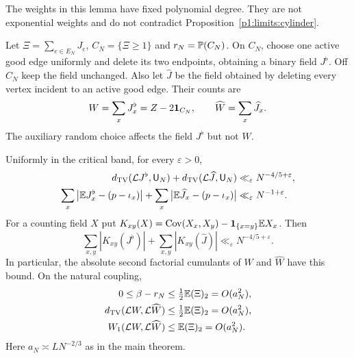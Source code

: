 The weights in this lemma have fixed polynomial degree.  They
are not exponential weights and do not contradict
Proposition~\ref{p1:limits:cylinder}.

Let $\Xi=\sum_{e\in E_N}J_e$, $C_N=\{\Xi\ge1\}$ and
$r_N=\P(C_N)$.  On $C_N$, choose one active good edge uniformly
and delete its two endpoints, obtaining a binary field $J^\flat$.
Off $C_N$ keep the field unchanged.  Also let $\widehat J$ be
the field obtained by deleting every vertex incident to an active
good edge.  Their counts are
\[
 W=\sum_xJ_x^\flat=Z-2\ind_{C_N},\qquad
 \widehat W=\sum_x\widehat J_x.
\]
The auxiliary random choice affects the field $J^\flat$ but
not $W$.

\begin{proposition}
\label{p1:limits:erasure}
Uniformly in the critical band, for every $\varepsilon>0$,
\begin{align}
 \TV(\Law J^\flat,\mathsf U_N)
       +\TV(\Law\widehat J,\mathsf U_N)
       &\ll_\varepsilon N^{-4/5+\varepsilon},
       \label{p1:limits:erasure-tv}\\
 \sum_x\big|\E J_x^\flat-(p-\iota_x)\big|
       +\sum_x\big|\E\widehat J_x-(p-\iota_x)\big|
       &\ll_\varepsilon N^{-1+\varepsilon}.
       \label{p1:limits:erasure-intensity}
\end{align}
For a counting field $X$ put
$K_{xy}(X)=\Cov(X_x,X_y)-\ind_{\{x=y\}}\E X_x$.
Then
\begin{equation}
 \sum_{x,y}|K_{xy}(J^\flat)|+
 \sum_{x,y}|K_{xy}(\widehat J)|
       \ll_\varepsilon N^{-4/5+\varepsilon}.
 \label{p1:limits:erasure-covariance}
\end{equation}
In particular, the absolute second factorial cumulants of
$W$ and $\widehat W$ have this bound.  On the natural coupling,
\begin{align}
 0\le\beta-r_N&\le\tfrac12\E(\Xi)_2=O(a_N^2),
       \label{p1:limits:edge-occurrence}\\
 \TV(\Law W,\Law\widehat W)&\le\tfrac12\E(\Xi)_2=O(a_N^2),
       \label{p1:limits:one-all-tv}\\
 W_1(\Law W,\Law\widehat W)&\le\E(\Xi)_2=O(a_N^2).
       \label{p1:limits:one-all-wasserstein}
\end{align}
Here $a_N\asymp L N^{-2/3}$ as in the main theorem.
\end{proposition}
